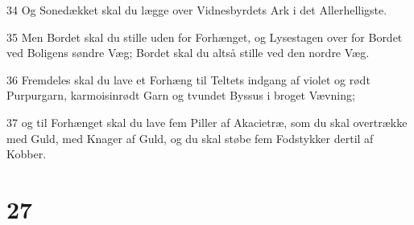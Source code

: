 \par 34 Og Sonedækket skal du lægge over Vidnesbyrdets Ark i det Allerhelligste.
\par 35 Men Bordet skal du stille uden for Forhænget, og Lysestagen over for Bordet ved Boligens søndre Væg; Bordet skal du altså stille ved den nordre Væg.
\par 36 Fremdeles skal du lave et Forhæng til Teltets indgang af violet og rødt Purpurgarn, karmoisinrødt Garn og tvundet Byssus i broget Vævning;
\par 37 og til Forhænget skal du lave fem Piller af Akacietræ, som du skal overtrække med Guld, med Knager af Guld, og du skal støbe fem Fodstykker dertil af Kobber.

\chapter{27}

